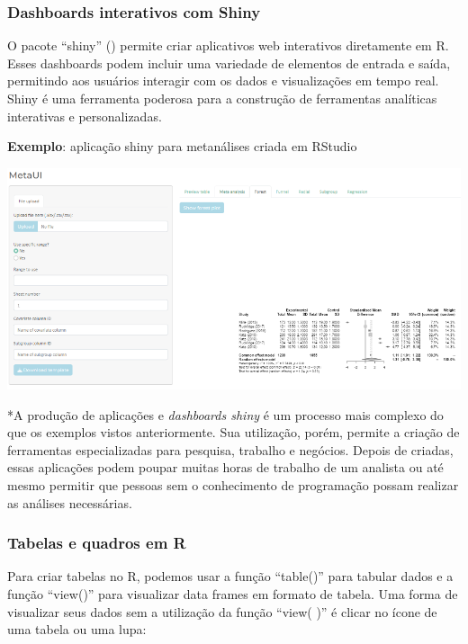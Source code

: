 \documentclass[
]{book}
\begin{document}
\subsubsection{Dashboards interativos com Shiny}\label{dashboards-interativos-com-shiny}

O pacote ``shiny'' () permite criar aplicativos web interativos diretamente em R. Esses dashboards podem incluir uma variedade de elementos de entrada e saída, permitindo aos usuários interagir com os dados e visualizações em tempo real. Shiny é uma ferramenta poderosa para a construção de ferramentas analíticas interativas e personalizadas.

\textbf{Exemplo}: aplicação shiny para metanálises criada em RStudio

\includegraphics{images/clipboard-3316300773.png}

*A produção de aplicações e \emph{dashboards shiny} é um processo mais complexo do que os exemplos vistos anteriormente. Sua utilização, porém, permite a criação de ferramentas especializadas para pesquisa, trabalho e negócios. Depois de criadas, essas aplicações podem poupar muitas horas de trabalho de um analista ou até mesmo permitir que pessoas sem o conhecimento de programação possam realizar as análises necessárias.

\subsubsection{Tabelas e quadros em R}\label{tabelas-e-quadros-em-r}

Para criar tabelas no R, podemos usar a função ``table()'' para tabular dados e a função ``view()'' para visualizar data frames em formato de tabela. Uma forma de visualizar seus dados sem a utilização da função ``view( )'' é clicar no ícone de uma tabela ou uma lupa:
\end{document}
